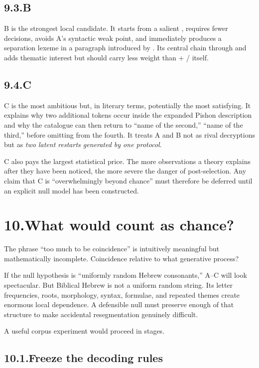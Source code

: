 \subsection*{9.3.\quad B}

B is the strongest local candidate.  It starts from a salient , requires fewer decisions, avoids A's syntactic weak point, and immediately produces a separation lexeme in a paragraph introduced by .  Its central chain through  and  adds thematic interest but should carry less weight than  + / itself.

\subsection*{9.4.\quad C}

C is the most ambitious but, in literary terms, potentially the most satisfying.  It explains why two additional  tokens occur inside the expanded Pishon description and why the catalogue can then return to ``name of the second,'' ``name of the third,'' before omitting  from the fourth.  It treats A and B not as rival decryptions but as \emph{two latent restarts generated by one protocol}.

C also pays the largest statistical price.  The more observations a theory explains after they have been noticed, the more severe the danger of post-selection.  Any claim that C is ``overwhelmingly beyond chance'' must therefore be deferred until an explicit null model has been constructed.

\section*{10.\quad What would count as chance?}

The phrase ``too much to be coincidence'' is intuitively meaningful but mathematically incomplete.  Coincidence relative to what generative process?

If the null hypothesis is ``uniformly random Hebrew consonants,'' A--C will look spectacular.  But Biblical Hebrew is not a uniform random string.  Its letter frequencies, roots, morphology, syntax, formulae, and repeated themes create enormous local dependence.  A defensible null must preserve enough of that structure to make accidental resegmentation genuinely difficult.

A useful corpus experiment would proceed in stages.

\subsection*{10.1.\quad Freeze the decoding rules}

